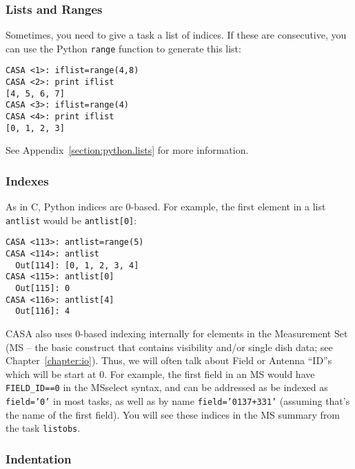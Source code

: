 \subsubsection{Lists and Ranges}
\label{section:intro.basics.python.lists}

Sometimes, you need to give a task a list of indices.  If these
are consecutive, you can use the Python {\tt range} function to 
generate this list:
\small
\begin{verbatim}
CASA <1>: iflist=range(4,8)
CASA <2>: print iflist
[4, 5, 6, 7]
CASA <3>: iflist=range(4)
CASA <4>: print iflist
[0, 1, 2, 3]
\end{verbatim}
\normalsize

See Appendix~\ref{section:python.lists} for more information.

\subsubsection{Indexes}
\label{section:intro.basics.python.index}

As in C, Python indices are 0-based.  For example, the first
element in a list {\tt antlist} would be {\tt antlist[0]}:
\small
\begin{verbatim}
CASA <113>: antlist=range(5)
CASA <114>: antlist
  Out[114]: [0, 1, 2, 3, 4]
CASA <115>: antlist[0]
  Out[115]: 0
CASA <116>: antlist[4]
  Out[116]: 4
\end{verbatim}
\normalsize

CASA also uses 0-based indexing internally for elements in the Measurement
Set (MS -- the basic construct that contains visibility and/or single dish
data; see Chapter~\ref{chapter:io}).
Thus, we will often talk about Field or Antenna ``ID''s
which will be start at 0.  For example, the first field in an MS
would have {\tt FIELD\_ID==0} in the MSselect syntax, and can
be addressed as be indexed as {\tt field='0'} in most tasks, as
well as by name {\tt field='0137+331'} (assuming that's the name
of the first field).  You will see these indices in the MS summary
from the task {\tt listobs}. 

\subsubsection{Indentation}
\label{section:intro.basics.python.indent}

